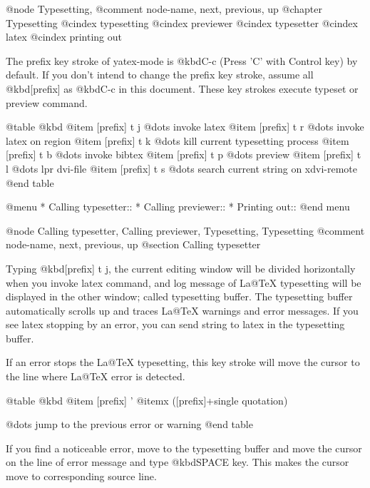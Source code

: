 @node Typesetting, %
@comment  node-name,  next,  previous,  up
@chapter Typesetting
@cindex typesetting
@cindex previewer
@cindex typesetter
@cindex latex
@cindex printing out

  The prefix key stroke of yatex-mode is @kbd{C-c} (Press 'C' with Control
key) by default.  If you don't intend to change the prefix key stroke,
assume all @kbd{[prefix]} as @kbd{C-c} in this document.  These key
strokes execute typeset or preview command.

@table @kbd
@item [prefix] t j
        @dots{} invoke latex
@item [prefix] t r
        @dots{} invoke latex on region
@item [prefix] t k
        @dots{} kill current typesetting process
@item [prefix] t b
        @dots{} invoke bibtex
@item [prefix] t p
        @dots{} preview
@item [prefix] t l
        @dots{} lpr dvi-file
@item [prefix] t s
        @dots{} search current string on xdvi-remote
@end table

@menu
* Calling typesetter::          
* Calling previewer::           
* Printing out::                
@end menu

@node Calling typesetter, Calling previewer, Typesetting, Typesetting
@comment  node-name,  next,  previous,  up
@section Calling typesetter

  Typing @kbd{[prefix] t j}, the current editing window will be divided
horizontally when you invoke latex command, and log message of La@TeX{}
typesetting will be displayed in the other window; called typesetting
buffer.  The typesetting buffer automatically scrolls up and traces
La@TeX{} warnings and error messages.  If you see latex stopping by an
error, you can send string to latex in the typesetting buffer.

  If an error  stops the La@TeX{}  typesetting, this  key stroke will
move the cursor to the line where La@TeX{} error is detected.

@table @kbd
@item [prefix] '
@itemx ([prefix]+single quotation)

        @dots{} jump to the previous error or warning
@end table

  If you find a noticeable error, move to the typesetting buffer and move
the cursor on the line of error message and type @kbd{SPACE} key.  This
makes the cursor move to corresponding source line.

